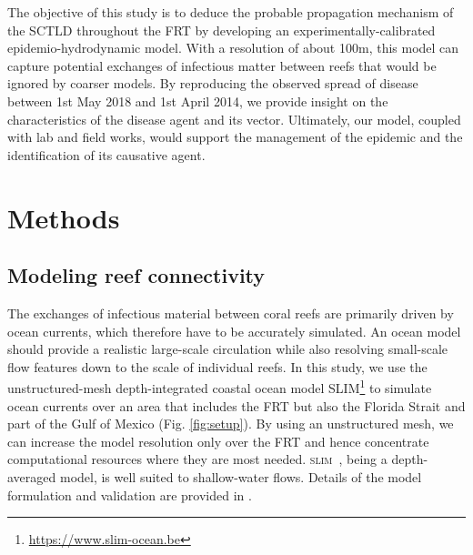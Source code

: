 \documentclass[utf8]{frontiersSCNS}
\newcommand{\slim}{\textsc{slim}\ }
\begin{document}
The objective of this study is to deduce the probable propagation mechanism of the SCTLD throughout the FRT by developing an experimentally-calibrated epidemio-hydrodynamic model. With a resolution of about 100m, this model can capture potential exchanges of infectious matter between reefs that would be ignored by coarser models. By reproducing the observed spread of disease between 1st May 2018 and 1st April 2014, we provide insight on the characteristics of the disease agent and its vector. Ultimately, our model, coupled with lab and field works, would support the management of the epidemic and the identification of its causative agent.

\section{Methods}

\subsection{Modeling reef connectivity}
The exchanges of infectious material between coral reefs are primarily driven by ocean currents, which therefore have to be accurately simulated. An ocean model should provide a realistic large-scale circulation while also resolving small-scale flow features down to the scale of individual reefs. In this study, we use the unstructured-mesh depth-integrated coastal ocean model SLIM\footnote{\url{https://www.slim-ocean.be}} to simulate ocean currents over an area that includes the FRT but also the Florida Strait and part of the Gulf of Mexico (Fig. \ref{fig:setup}). By using an unstructured mesh, we can increase the model resolution only over the FRT and hence concentrate computational resources where they are most needed. \slim, being a depth-averaged model, is well suited to shallow-water flows. %
Details of the model formulation and validation are provided in \cite{frys20}. 
\end{document}
